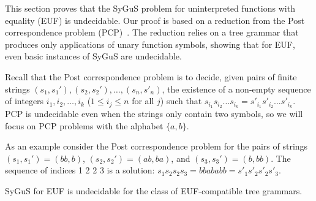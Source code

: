 
This section proves that the SyGuS problem for uninterpreted functions with equality (EUF) is undecidable. Our proof is based on a reduction from the Post correspondence problem (PCP)~\cite{post1946variant}. 
The reduction relies on a tree grammar that produces only applications of unary function symbols, showing that for EUF, even basic instances of SyGuS are undecidable. 



Recall that the Post correspondence problem is to decide, given pairs of finite strings $(s_1, s_1'), (s_2, s_2'),\ldots,(s_n,s'_n)$, the existence of a non-empty sequence of integers $i_1,i_2,\dots,i_k$ ($1\leq i_j \leq n$ for all $j$) such that $s_{i_1}s_{i_2}\dots s_{i_k} = s'_{i_1}s'_{i_2}\dots s'_{i_k}$. 
PCP is undecidable even when the strings only contain two symbols, so we will focus on PCP problems with the alphabet $\{a,b\}$. 

As an example consider the Post correspondence problem for the pairs of strings $(s_1, s_1') = (bb,b)$, $(s_2, s_2') = (ab,ba)$, and  $(s_3, s_3') = (b,bb)$. 
The sequence of indices 1 2 2 3 is a solution: $s_1s_2s_2s_3 = bbababb = s'_1s'_2s'_2s'_3$. 


\begin{theorem}
\label{thm:euf_und}
SyGuS for EUF is undecidable for the class of EUF-compatible tree grammars. 
\end{theorem}

